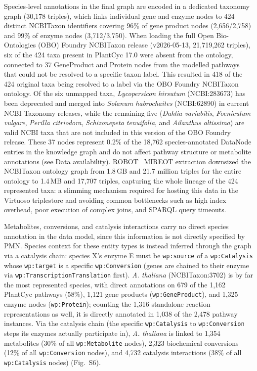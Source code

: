 \documentclass[11pt,a4paper]{article}
\begin{document}
Species-level annotations in the final graph are encoded in a dedicated taxonomy graph (30,178
triples), which links individual gene and enzyme nodes to 424 distinct NCBITaxon identifiers covering
96\% of gene product nodes (2,656/2,758) and 99\% of enzyme nodes (3,712/3,750). When loading the full
Open Bio-Ontologies (OBO) Foundry NCBITaxon release (v2026-05-13, 21,719,262 triples), six of the 424
taxa present in PlantCyc 17.0 were absent from the ontology, connected to 37 GeneProduct and Protein
nodes from the modelled pathways that could not be resolved to a specific taxon label. This resulted
in 418 of the 424 original taxa being resolved to a label via the OBO Foundry NCBITaxon ontology. Of
the six unmapped taxa, \textit{Lycopersicon hirsutum} (NCBI:283673) has been deprecated and merged
into \textit{Solanum habrochaites} (NCBI:62890) in current NCBI Taxonomy releases, while the remaining
five (\textit{Dahlia variabilis}, \textit{Foeniculum vulgare}, \textit{Perilla citriodora},
\textit{Schizonepeta tenuifolia}, and \textit{Ailanthus altissima}) are valid NCBI taxa that are not
included in this version of the OBO Foundry release. These 37 nodes represent 0.2\% of the 18,762
species-annotated DataNode entries in the knowledge graph and do not affect pathway structure or
metabolite annotations (see Data availability). ROBOT~\cite{jackson2019} MIREOT extraction downsized
the NCBITaxon ontology graph from 1.8\,GB and 21.7 million triples for the entire ontology to 1.4\,MB
and 17,707 triples, capturing the whole lineage of the 424 represented taxa: a slimming mechanism
required for hosting this data in the Virtuoso triplestore and avoiding common bottlenecks such as
high index overhead, poor execution of complex joins, and SPARQL query timeouts.

Metabolites, conversions, and catalysis interactions carry no direct species annotation in the data
model, since this information is not directly specified by PMN. Species context for these entity types
is instead inferred through the graph via a catalysis chain: species X's enzyme E must be
\texttt{wp:source} of a \texttt{wp:Catalysis} whose \texttt{wp:target} is a specific
\texttt{wp:Conversion} (genes are chained to their enzyme via \texttt{wp:TranscriptionTranslation}
first). \textit{A. thaliana} (NCBITaxon:3702) is by far the most represented species, with direct
annotations on 679 of the 1,162 PlantCyc pathways (58\%), 1,121 gene products
(\texttt{wp:GeneProduct}), and 1,325 enzyme nodes (\texttt{wp:Protein}); counting the 1,316 standalone
reaction representations as well, it is directly annotated in 1,038 of the 2,478 pathway instances.
Via the catalysis chain (the specific \texttt{wp:Catalysis} to \texttt{wp:Conversion} steps its
enzymes actually participate in), \textit{A. thaliana} is linked to 1,354 metabolites (30\% of all
\texttt{wp:Metabolite} nodes), 2,323 biochemical conversions (12\% of all \texttt{wp:Conversion}
nodes), and 4,732 catalysis interactions (38\% of all \texttt{wp:Catalysis} nodes) (Fig.~S6).
\end{document}
